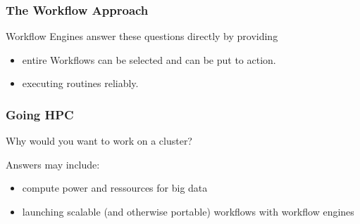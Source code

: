 \begin{frame}
  \frametitle{The Workflow Approach}
  Workflow Engines answer these questions directly by providing
  \begin{itemize}
   \item entire Workflows can be selected and can be put to action.
   \item executing routines reliably.
  \end{itemize}
\end{frame}

\begin{frame}
  \frametitle{Going HPC}
  \begin{question}
  	Why would you want to work on a cluster?
  \end{question}
  \pause
  Answers may include:
  \begin{itemize}[<+->]
   \item compute power and ressources for big data
   \item launching scalable (and otherwise portable) workflows with workflow engines
  \end{itemize}
\end{frame}
